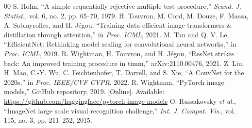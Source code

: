 \documentclass[conference]{IEEEtran}
\begin{document}
\begin{thebibliography}{00}
 S. Holm, ``A simple sequentially rejective multiple test procedure,'' \emph{Scand. J. Statist.}, vol. 6, no. 2, pp. 65--70, 1979.
 H. Touvron, M. Cord, M. Douze, F. Massa, A. Sablayrolles, and H. J\'egou, ``Training data-efficient image transformers \& distillation through attention,'' in \emph{Proc. ICML}, 2021.
 M. Tan and Q. V. Le, ``EfficientNet: Rethinking model scaling for convolutional neural networks,'' in \emph{Proc. ICML}, 2019.
 R. Wightman, H. Touvron, and H. J\'egou, ``ResNet strikes back: An improved training procedure in timm,'' arXiv:2110.00476, 2021.
 Z. Liu, H. Mao, C.-Y. Wu, C. Feichtenhofer, T. Darrell, and S. Xie, ``A ConvNet for the 2020s,'' in \emph{Proc. IEEE/CVF CVPR}, 2022.
 R. Wightman, ``PyTorch image models,'' GitHub repository, 2019. [Online]. Available: \url{https://github.com/huggingface/pytorch-image-models}
 O. Russakovsky \emph{et al.}, ``ImageNet large scale visual recognition challenge,'' \emph{Int. J. Comput. Vis.}, vol. 115, no. 3, pp. 211--252, 2015.
\end{thebibliography}
\end{document}
